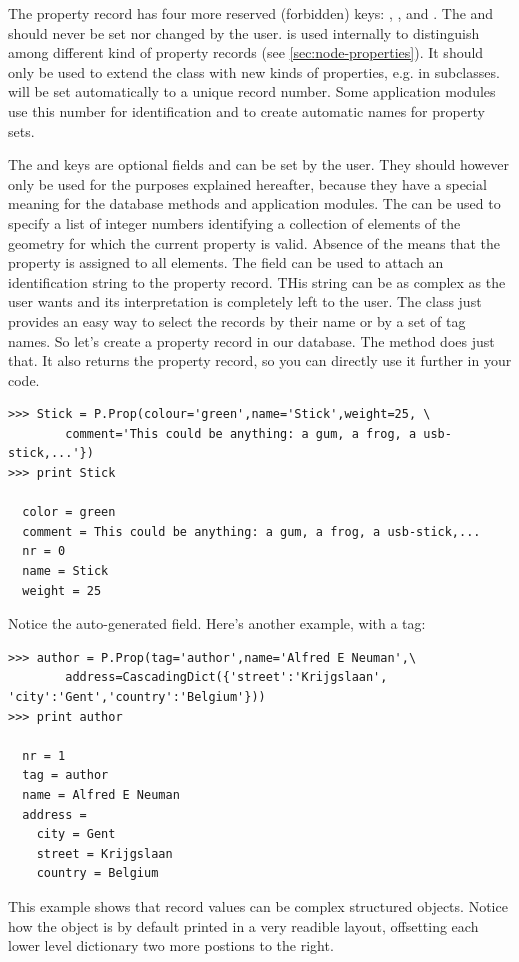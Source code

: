 The property record has four more reserved (forbidden) keys: , ,  and . The  and  should never be set nor changed by the user.  is used internally to distinguish among different kind of property records (see \ref{sec:node-properties}). It should only be used to extend the  class with new kinds of properties, e.g. in subclasses.  will be set automatically to a unique record number. Some application modules use this number for identification and to create automatic names for property sets. 

The  and  keys are optional fields and can be set by the user. They should however only be used for the purposes explained hereafter, because they have a special meaning for the database methods and application modules. The  can be used to specify a list of integer numbers identifying a collection of elements of the geometry for which the current property is valid. Absence of the  means that the property is assigned to all elements. The  field can be used to attach an identification string to the property record. THis string can be as complex as the user wants and its interpretation is completely left to the user. The  class just provides an easy way to select the records by their  name or by a set of tag names.  
So let's create a property record in our database. The  method does just that. It also returns the property record, so you can directly use it further in your code.
\begin{verbatim}
>>> Stick = P.Prop(colour='green',name='Stick',weight=25, \
        comment='This could be anything: a gum, a frog, a usb-stick,...'})
>>> print Stick

  color = green
  comment = This could be anything: a gum, a frog, a usb-stick,...
  nr = 0
  name = Stick
  weight = 25
\end{verbatim}
Notice the auto-generated  field. Here's another example, with a tag:
\begin{verbatim}
>>> author = P.Prop(tag='author',name='Alfred E Neuman',\
        address=CascadingDict({'street':'Krijgslaan', 'city':'Gent','country':'Belgium'}))
>>> print author

  nr = 1
  tag = author
  name = Alfred E Neuman
  address = 
    city = Gent
    street = Krijgslaan
    country = Belgium
\end{verbatim}
This example shows that record values can be complex structured objects.
Notice how the  object is by default printed in a very readible layout, offsetting each lower level dictionary two more postions to the right. 

